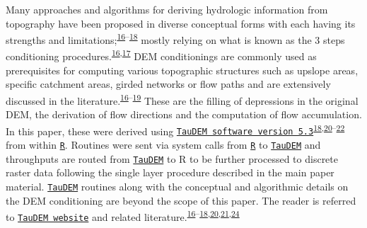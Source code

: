 \documentclass[12pt,oneside]{article}
\begin{document}
Many approaches and algorithms for deriving hydrologic information from topography have been proposed in diverse conceptual forms with each having its strengths and limitations;\textsuperscript{\protect\hyperlink{ref-Arge_et_al_2003}{16}--\protect\hyperlink{ref-Tarboton_1997}{18}} mostly relying on what is known as the 3 steps conditioning procedures.\textsuperscript{\protect\hyperlink{ref-Arge_et_al_2003}{16},\protect\hyperlink{ref-Jenson_and_Domingue_1988}{17}} DEM conditionings are commonly used as prerequisites for computing various topographic structures such as upslope areas, specific catchment areas, girded networks or flow paths and are extensively discussed in the literature.\textsuperscript{\protect\hyperlink{ref-Arge_et_al_2003}{16}--\protect\hyperlink{ref-OCallaghan_Mark_1984}{19}} These are the filling of depressions in the original DEM, the derivation of flow directions and the computation of flow accumulation. In this paper, these were derived using \href{http://hydrology.usu.edu/taudem/taudem5/}{\texttt{TauDEM\ software\ version\ 5.3}}\textsuperscript{\protect\hyperlink{ref-Tarboton_1997}{18},\protect\hyperlink{ref-Tarboton_et_al_1991}{20}--\protect\hyperlink{ref-Yang_et_al_2006}{22}} from within \href{https://cran.r-project.org/}{\texttt{R}}. Routines were sent via system calls from \href{https://cran.r-project.org/}{\texttt{R}} to \href{http://hydrology.usu.edu/taudem/taudem5/}{\texttt{TauDEM}} and throughputs are routed from \href{http://hydrology.usu.edu/taudem/taudem5/}{\texttt{TauDEM}} to R to be further processed to discrete raster data following the single layer procedure described in the main paper material. \href{http://hydrology.usu.edu/taudem/taudem5/}{\texttt{TauDEM}} routines along with the conceptual and algorithmic details on the DEM conditioning are beyond the scope of this paper. The reader is referred to \href{http://hydrology.usu.edu/taudem/taudem5/documentation.html}{\texttt{TauDEM\ website}} and related literature.\textsuperscript{\protect\hyperlink{ref-Arge_et_al_2003}{16}--\protect\hyperlink{ref-Tarboton_1997}{18},\protect\hyperlink{ref-Tarboton_et_al_1991}{20},\protect\hyperlink{ref-Tesfa_et_al_2011}{21},\protect\hyperlink{ref-Wallis_et_al_2009}{24}}
\end{document}
